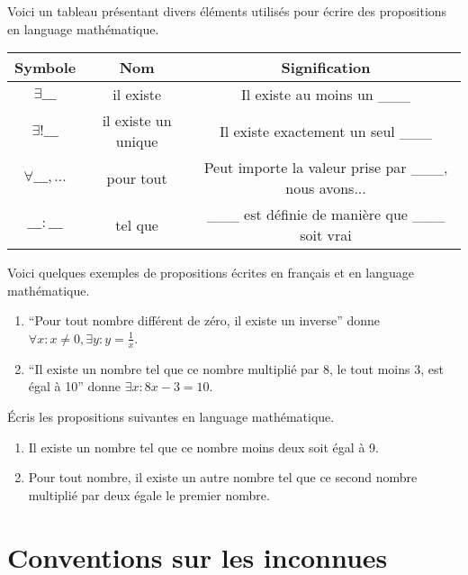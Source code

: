 Voici un tableau présentant divers éléments utilisés pour écrire des propositions en language mathématique.
\begin{table}[H]
    \centering
    \begin{tabular}{|c|c|c|}
        \hline
        \textbf{Symbole} & \textbf{Nom} & \textbf{Signification} \\ \hline
        $\exists \_\_\_$ & il existe & Il existe au moins un \_\_\_ \\ \hline
        $\exists ! \_\_\_$ & il existe un unique & Il existe exactement un seul \_\_\_ \\ \hline
        $\forall \_\_\_, ...$ & pour tout & Peut importe la valeur prise par \_\_\_, nous avons... \\ \hline
        $\_\_\_ : \_\_\_$ & tel que & \_\_\_ est définie de manière que \_\_\_ soit vrai \\ \hline
    \end{tabular}
\end{table}

\begin{exemple}
    Voici quelques exemples de propositions écrites en français et en language mathématique.
    \begin{enumerate}
        \item ``Pour tout nombre différent de zéro, il existe un inverse'' donne $\forall x : x\not=0, \exists y : y=\frac1x$.
        \item ``Il existe un nombre tel que ce nombre multiplié par 8, le tout moins 3, est égal à 10'' donne $\exists x : 8x - 3 = 10$.
    \end{enumerate}
\end{exemple}

\vspace{1em}

\begin{exercice}
    Écris les propositions suivantes en language mathématique.
    \begin{enumerate}
        \item Il existe un nombre tel que ce nombre moins deux soit égal à 9.
        \item Pour tout nombre, il existe un autre nombre tel que ce second nombre multiplié par deux égale le premier nombre.
    \end{enumerate}
\end{exercice}

\section{Conventions sur les inconnues}

